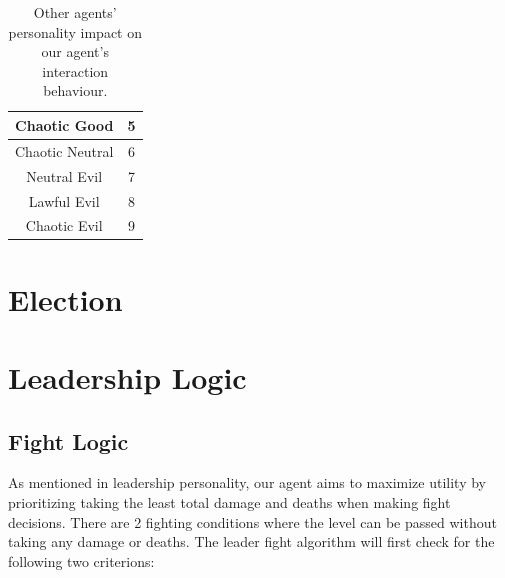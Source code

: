 \begin{table}[h!]
\begin{tabular}{ |c|p{16em}|p{16em}| }
        \hline
        Chaotic Good                      & \multicolumn{2}{c|}{5}                                                                                                                                                                                                                \\
        \hline
        Chaotic Neutral                   & \multicolumn{2}{c|}{6}                                                                                                                                                                                                                \\
        \hline
        Neutral Evil                      & \multicolumn{2}{c|}{7}                                                                                                                                                                                                                \\
        \hline
        Lawful Evil                       & \multicolumn{2}{c|}{8}                                                                                                                                                                                                                \\
        \hline
        Chaotic Evil                      & \multicolumn{2}{c|}{9}                                                                                                                                                                                                                \\
        \hline
    \end{tabular}
    \caption{Other agents' personality impact on our agent's interaction behaviour.}
    \label{table:personality_impact}
\end{table}

\section{Election}

\section{Leadership Logic}
\subsection{Fight Logic}
As mentioned in leadership personality, our agent aims to maximize utility by prioritizing taking the least total damage and deaths when making fight decisions. There are 2 fighting conditions where the level can be passed without taking any damage or deaths. The leader fight algorithm will first check for the following two criterions:

